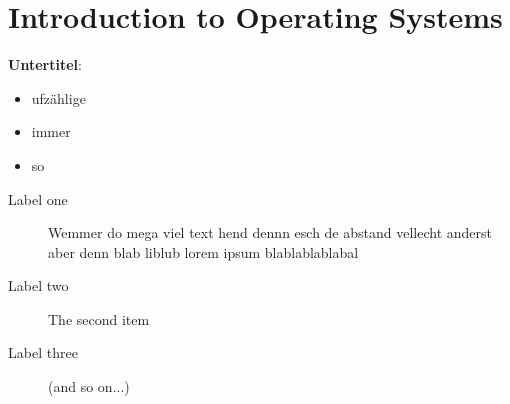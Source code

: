 \section*{Introduction to Operating Systems}
\textbf{Untertitel}: 
\begin{itemize}
    \item ufzählige 
    \item immer
    \item so 
\end{itemize}
\begin{description}
    \item[Label one] Wemmer do mega viel text hend dennn esch de abstand vellecht anderst aber denn blab liblub lorem ipsum blablablablabal
    \item[Label two] The second item
    \item[Label three] (and so on...)
\end{description}